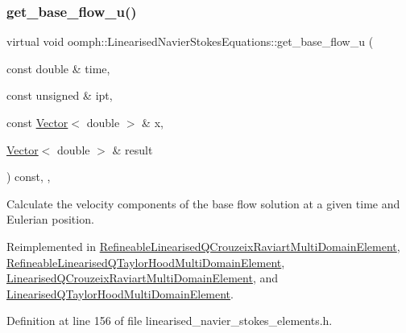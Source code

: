 \mbox{\label{classoomph_1_1LinearisedNavierStokesEquations_a7c219a316dbe67ef01f8c5b666e0c9ae}} 
\subsubsection{\texorpdfstring{get\+\_\+base\+\_\+flow\+\_\+u()}{get\_base\_flow\_u()}}
{\footnotesize\ttfamily virtual void oomph\+::\+Linearised\+Navier\+Stokes\+Equations\+::get\+\_\+base\+\_\+flow\+\_\+u (\begin{DoxyParamCaption}\item[{const double \&}]{time,  }\item[{const unsigned \&}]{ipt,  }\item[{const \hyperlink{classoomph_1_1Vector}{Vector}$<$ double $>$ \&}]{x,  }\item[{\hyperlink{classoomph_1_1Vector}{Vector}$<$ double $>$ \&}]{result }\end{DoxyParamCaption}) const\hspace{0.3cm}{\ttfamily [inline]}, {\ttfamily [protected]}, {\ttfamily [virtual]}}



Calculate the velocity components of the base flow solution at a given time and Eulerian position. 



Reimplemented in \hyperlink{classRefineableLinearisedQCrouzeixRaviartMultiDomainElement_a029e6ec7bfe31971e78cf0208bf8c3e9}{Refineable\+Linearised\+Q\+Crouzeix\+Raviart\+Multi\+Domain\+Element}, \hyperlink{classRefineableLinearisedQTaylorHoodMultiDomainElement_add3d103c76066426856143d9b683053d}{Refineable\+Linearised\+Q\+Taylor\+Hood\+Multi\+Domain\+Element}, \hyperlink{classLinearisedQCrouzeixRaviartMultiDomainElement_afb43b8c81d6421ce18f5d07bda931621}{Linearised\+Q\+Crouzeix\+Raviart\+Multi\+Domain\+Element}, and \hyperlink{classLinearisedQTaylorHoodMultiDomainElement_ad441b17104c64206b308779a52cc814e}{Linearised\+Q\+Taylor\+Hood\+Multi\+Domain\+Element}.



Definition at line 156 of file linearised\+\_\+navier\+\_\+stokes\+\_\+elements.\+h.



